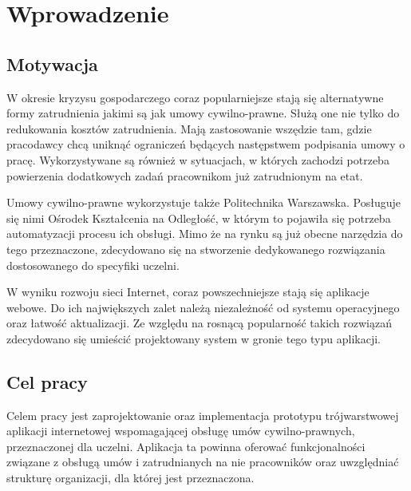 \chapter{Wprowadzenie}

\section[Motywacja][Motywacja]{Motywacja}
W okresie kryzysu gospodarczego coraz popularniejsze stają się alternatywne formy zatrudnienia jakimi są jak umowy cywilno-prawne. Służą one nie tylko do redukowania kosztów zatrudnienia. Mają zastosowanie wszędzie tam, gdzie pracodawcy chcą uniknąć ograniczeń będących następstwem podpisania umowy o pracę. Wykorzystywane są również w sytuacjach, w których zachodzi potrzeba powierzenia dodatkowych zadań pracownikom już zatrudnionym na etat.

Umowy cywilno-prawne wykorzystuje także Politechnika Warszawska. Posługuje się nimi Ośrodek Kształcenia na Odległość, w którym to pojawiła się potrzeba automatyzacji procesu ich obsługi. Mimo że na rynku są już obecne narzędzia do tego przeznaczone, zdecydowano się na stworzenie dedykowanego rozwiązania dostosowanego do specyfiki uczelni.

W wyniku rozwoju sieci Internet, coraz powszechniejsze stają się aplikacje webowe. Do ich największych zalet należą niezależność od systemu operacyjnego oraz łatwość aktualizacji. Ze względu na rosnącą popularność takich rozwiązań zdecydowano się umieścić projektowany system w gronie tego typu aplikacji.

\section[Cel pracy][Cel pracy]{Cel pracy}
Celem pracy jest zaprojektowanie oraz implementacja prototypu trójwarstwowej aplikacji internetowej wspomagającej obsługę umów cywilno-prawnych, przeznaczonej dla uczelni. Aplikacja ta powinna oferować funkcjonalności związane z obsługą umów i zatrudnianych na nie pracowników oraz uwzględniać strukturę organizacji, dla której jest przeznaczona.



